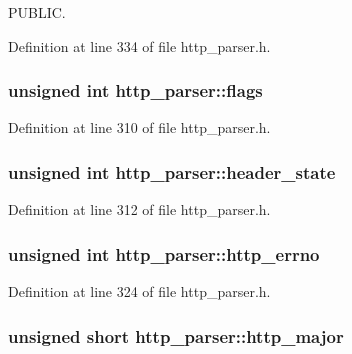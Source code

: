 P\-U\-B\-L\-I\-C. 



Definition at line 334 of file http\-\_\-parser.\-h.

\hypertarget{structhttp__parser_a5e54708e0cb3f9ced19bd829dcdeaf53}{
\subsubsection[{flags}]{\setlength{\rightskip}{0pt plus 5cm}unsigned int http\-\_\-parser\-::flags}}\label{structhttp__parser_a5e54708e0cb3f9ced19bd829dcdeaf53}


Definition at line 310 of file http\-\_\-parser.\-h.

\hypertarget{structhttp__parser_ac5b254b99c6472ca19ae1f426758ce75}{
\subsubsection[{header\-\_\-state}]{\setlength{\rightskip}{0pt plus 5cm}unsigned int http\-\_\-parser\-::header\-\_\-state}}\label{structhttp__parser_ac5b254b99c6472ca19ae1f426758ce75}


Definition at line 312 of file http\-\_\-parser.\-h.

\hypertarget{structhttp__parser_ab8638d65fa174bc1925d77e2533117fa}{
\subsubsection[{http\-\_\-errno}]{\setlength{\rightskip}{0pt plus 5cm}unsigned int http\-\_\-parser\-::http\-\_\-errno}}\label{structhttp__parser_ab8638d65fa174bc1925d77e2533117fa}


Definition at line 324 of file http\-\_\-parser.\-h.

\hypertarget{structhttp__parser_ac994a4a8268652f5ce82de5bde5c3f9d}{
\subsubsection[{http\-\_\-major}]{\setlength{\rightskip}{0pt plus 5cm}unsigned short http\-\_\-parser\-::http\-\_\-major}}\label{structhttp__parser_ac994a4a8268652f5ce82de5bde5c3f9d}


